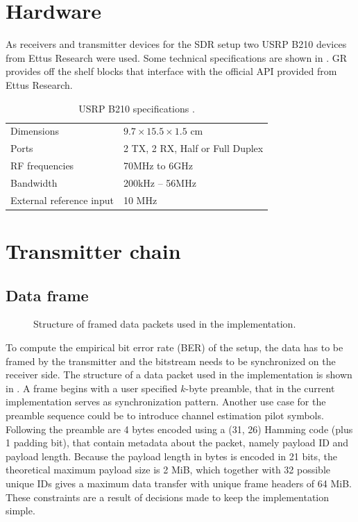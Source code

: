 \section{Hardware}

As receivers and transmitter devices for the SDR setup two USRP B210 devices from Ettus Research were used. Some technical specifications are shown in . GR provides off the shelf blocks that interface with the official API provided from Ettus Research.

\begin{table}[h]
	\centering
	\begin{tabular}{ll}
		\toprule
		Dimensions               & \(9.7 \times 15.5 \times 1.5\) cm \\
		Ports                    & 2 TX, 2 RX, Half or Full Duplex   \\
		RF frequencies           & 70MHz to 6GHz                     \\
		Bandwidth                & 200kHz -- 56MHz                   \\
		External reference input & 10 MHz                            \\
		\bottomrule
	\end{tabular}
	\caption{USRP B210 specifications \cite{EttusUSRPB210}. \label{tab:usrp-specs}}
\end{table}

\section{Transmitter chain}

\subsection{Data frame} \label{sec:data-frame}

\begin{figure}
\centering

	\caption{
		Structure of framed data packets used in the implementation.
		\label{fig:dataframe}
	}
\end{figure}

To compute the empirical bit error rate (BER) of the setup, the data has to be framed by the transmitter and the bitstream needs to be synchronized on the receiver side. The structure of a data packet used in the implementation is shown in . A frame begins with a user specified \(k\)-byte preamble, that in the current implementation serves as synchronization pattern. Another use case for the preamble sequence could be to introduce channel estimation pilot symbols. Following the preamble are 4 bytes encoded using a (31, 26) Hamming code (plus 1 padding bit), that contain metadata about the packet, namely payload ID and payload length. Because the payload length in bytes is encoded in 21 bits, the theoretical maximum payload size is 2 MiB, which together with 32 possible unique IDs gives a maximum data transfer with unique frame headers of 64 MiB. These constraints are a result of decisions made to keep the implementation simple. %


